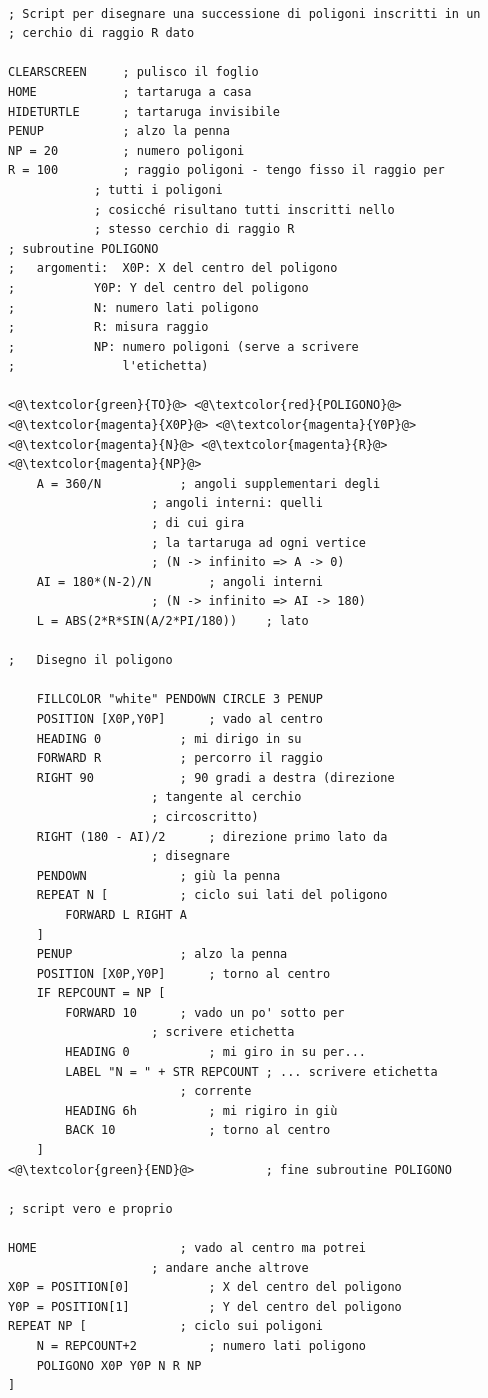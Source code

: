 \begin{lstlisting}[frame=single]  % Start your code-block

; Script per disegnare una successione di poligoni inscritti in un 
; cerchio di raggio R dato

CLEARSCREEN		; pulisco il foglio
HOME			; tartaruga a casa
HIDETURTLE		; tartaruga invisibile
PENUP			; alzo la penna
NP = 20			; numero poligoni
R = 100			; raggio poligoni - tengo fisso il raggio per  
			; tutti i poligoni
			; cosicché risultano tutti inscritti nello 
			; stesso cerchio di raggio R
; subroutine POLIGONO
; 	argomenti:	X0P: X del centro del poligono	
;			Y0P: Y del centro del poligono
;			N: numero lati poligono
;			R: misura raggio
;			NP: numero poligoni (serve a scrivere 
;			    l'etichetta)

<@\textcolor{green}{TO}@> <@\textcolor{red}{POLIGONO}@> <@\textcolor{magenta}{X0P}@> <@\textcolor{magenta}{Y0P}@> <@\textcolor{magenta}{N}@> <@\textcolor{magenta}{R}@> <@\textcolor{magenta}{NP}@>
 	A = 360/N			; angoli supplementari degli 
					; angoli interni: quelli 
					; di cui gira
					; la tartaruga ad ogni vertice  
					; (N -> infinito => A -> 0)
	AI = 180*(N-2)/N		; angoli interni  
					; (N -> infinito => AI -> 180)
	L = ABS(2*R*SIN(A/2*PI/180))	; lato

;	Disegno il poligono

	FILLCOLOR "white" PENDOWN CIRCLE 3 PENUP
	POSITION [X0P,Y0P]		; vado al centro
	HEADING 0			; mi dirigo in su
	FORWARD R			; percorro il raggio
	RIGHT 90			; 90 gradi a destra (direzione 
					; tangente al cerchio 
					; circoscritto)
	RIGHT (180 - AI)/2		; direzione primo lato da 
					; disegnare
	PENDOWN				; giù la penna
	REPEAT N [			; ciclo sui lati del poligono
		FORWARD L RIGHT A
	]
	PENUP				; alzo la penna
	POSITION [X0P,Y0P]		; torno al centro 
	IF REPCOUNT = NP [
		FORWARD 10		; vado un po' sotto per 
					; scrivere etichetta
		HEADING 0			; mi giro in su per...
		LABEL "N = " + STR REPCOUNT	; ... scrivere etichetta 
						; corrente 
		HEADING 6h			; mi rigiro in giù
		BACK 10				; torno al centro
	]
<@\textcolor{green}{END}@>			; fine subroutine POLIGONO

; script vero e proprio

HOME					; vado al centro ma potrei 
					; andare anche altrove 
X0P = POSITION[0]			; X del centro del poligono
Y0P = POSITION[1]			; Y del centro del poligono
REPEAT NP [				; ciclo sui poligoni
	N = REPCOUNT+2			; numero lati poligono
	POLIGONO X0P Y0P N R NP
]


\end{lstlisting}


